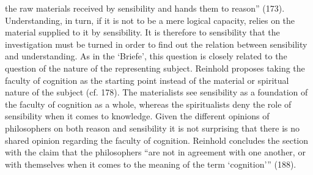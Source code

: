 the raw materials received by sensibility and hands them to reason'' (173). Understanding, in turn, if it is not to be a mere logical capacity, relies on the material supplied to it by sensibility. It is therefore to sensibility that the investigation must be turned in order to find out the relation between sensibility and understanding. As in the `Briefe', this question is closely related to the question of the nature of the representing subject. Reinhold proposes taking the faculty of cognition as the starting point instead of the material or spiritual nature of the subject (cf. 178). The materialists see sensibility as a foundation of the faculty of cognition as a whole, whereas the spiritualists deny the role of sensibility when it comes to knowledge. Given the different opinions of philosophers on both reason and sensibility it is not surprising that there is no shared opinion regarding the faculty of cognition. Reinhold concludes the section with the claim that the philosophers ``are not in agreement with one another, or with themselves when it comes to the meaning of the term `cognition''' (188). 

